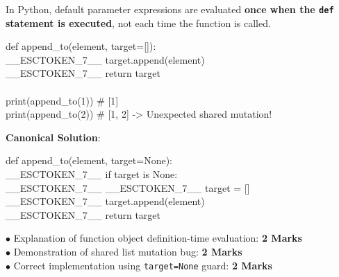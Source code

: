 \begin{solutionbox}
In Python, default parameter expressions are evaluated \textbf{once when the \texttt{def} statement is executed}, not each time the function is called.
\begin{pycode}
def append\_to(element, target=[]):\\
\_\_ESCTOKEN\_7\_\_ target.append(element)\\
\_\_ESCTOKEN\_7\_\_ return target\\
~\\
print(append\_to(1))  \# [1]\\
print(append\_to(2))  \# [1, 2] -> Unexpected shared mutation!
\end{pycode}
\textbf{Canonical Solution}:
\begin{pycode}
def append\_to(element, target=None):\\
\_\_ESCTOKEN\_7\_\_ if target is None:\\
\_\_ESCTOKEN\_7\_\_ \_\_ESCTOKEN\_7\_\_ target = []\\
\_\_ESCTOKEN\_7\_\_ target.append(element)\\
\_\_ESCTOKEN\_7\_\_ return target
\end{pycode}
\begin{markingrubric}
$\bullet$ Explanation of function object definition-time evaluation: \textbf{2 Marks}\\
$\bullet$ Demonstration of shared list mutation bug: \textbf{2 Marks}\\
$\bullet$ Correct implementation using \texttt{target=None} guard: \textbf{2 Marks}
\end{markingrubric}
\end{solutionbox}


